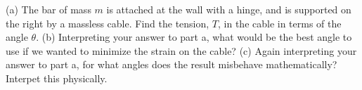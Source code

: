 (a) The bar of mass $m$ is attached at the wall with a hinge, and is supported
on the right by a massless cable. Find the tension, $T$, in the cable in terms of
the angle $\theta$.\answercheck\hwendpart
(b) Interpreting your answer to part a, what would be the best angle to use if we
wanted to minimize the strain on the cable?\hwendpart
(c) Again interpreting your answer to part a, for what angles does the result
misbehave mathematically? Interpet this physically.
